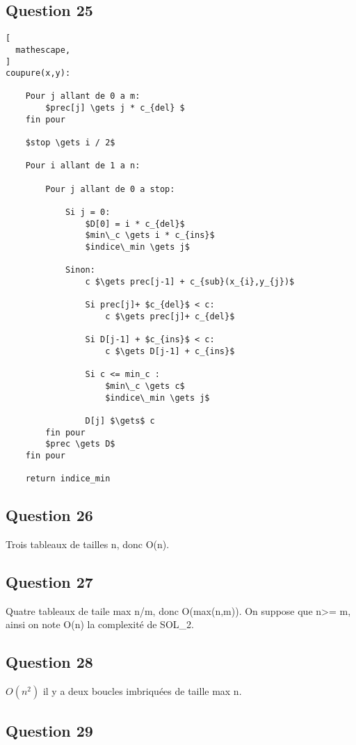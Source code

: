\documentclass{report}
\begin{document}
\clearpage
\subsection*{Question 25}

\begin{lstlisting}[
  mathescape,
]
coupure(x,y):

    Pour j allant de 0 a m:
        $prec[j] \gets j * c_{del} $
    fin pour
    
    $stop \gets i / 2$
    
    Pour i allant de 1 a n:
    
        Pour j allant de 0 a stop:
        
            Si j = 0:
                $D[0] = i * c_{del}$
                $min\_c \gets i * c_{ins}$
                $indice\_min \gets j$
                
            Sinon:
                c $\gets prec[j-1] + c_{sub}(x_{i},y_{j})$
                    
                Si prec[j]+ $c_{del}$ < c:
                    c $\gets prec[j]+ c_{del}$

                Si D[j-1] + $c_{ins}$ < c:
                    c $\gets D[j-1] + c_{ins}$
                    
                Si c <= min_c :
                    $min\_c \gets c$
                    $indice\_min \gets j$
                        
                D[j] $\gets$ c
        fin pour
        $prec \gets D$
    fin pour
    
    return indice_min

\end{lstlisting}


\subsection*{Question 26}
Trois tableaux de tailles n, donc O(n).

\subsection*{Question 27}
Quatre tableaux de taile max n/m, donc O(max(n,m)). On suppose que n>= m, ainsi on note O(n) la complexité de SOL\_2.

\subsection*{Question 28}
$O(n^{2})$ il y a deux boucles imbriquées de taille max n.

\subsection*{Question 29}
\end{document}
